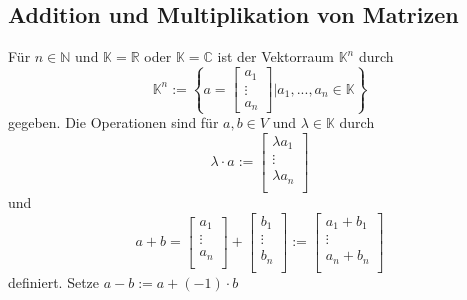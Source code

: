 \subsection{Addition und Multiplikation von Matrizen}
Für $n \in \mathbb{N}$ und $\mathbb{K} = \mathbb{R}$ oder $\mathbb{K} = \mathbb{C}$ ist der Vektorraum $\mathbb{K}^n$ durch
\begin{displaymath}
    \mathbb{K}^n:=\left\{a = 
    \begin{bmatrix} 
        a_1 \\ 
        \vdots \\ 
        a_n 
    \end{bmatrix}  
    \vert a_1,...,a_n \in \mathbb{K} \right\}
\end{displaymath}
gegeben. Die Operationen sind für $a,b \in V $ und $\lambda \in \mathbb{K}$ durch
\begin{displaymath}
    \lambda \cdot a := 
    \begin{bmatrix}
        \lambda a_1 \\
        \vdots \\
        \lambda a_n \\
    \end{bmatrix}
\end{displaymath}
und
\begin{displaymath}
    a+b = 
    \begin{bmatrix}
        a_1 \\
        \vdots \\
        a_n \\
    \end{bmatrix}
    +
    \begin{bmatrix}
        b_1 \\
        \vdots \\
        b_n \\
    \end{bmatrix}
    :=
    \begin{bmatrix}
        a_1 + b_1 \\
        \vdots \\
        a_n + b_n \\
    \end{bmatrix}
\end{displaymath}
definiert. Setze $a-b := a+(-1)\cdot b$
